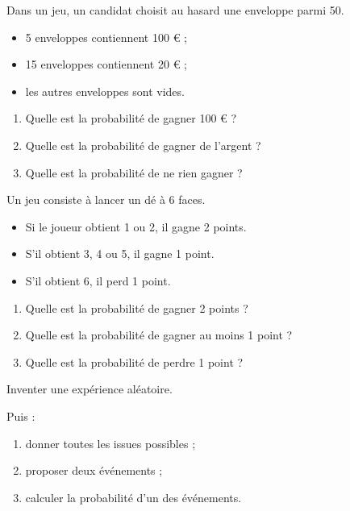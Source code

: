 \documentclass[11pt]{article}
\begin{document}
\begin{exercice}

Dans un jeu, un candidat choisit au hasard une enveloppe parmi 50.

\begin{itemize}
    \item 5 enveloppes contiennent 100 € ;
    \item 15 enveloppes contiennent 20 € ;
    \item les autres enveloppes sont vides.
\end{itemize}

\begin{enumerate}
    \item Quelle est la probabilité de gagner 100 € ?
    \item Quelle est la probabilité de gagner de l'argent ?
    \item Quelle est la probabilité de ne rien gagner ?
\end{enumerate}

\end{exercice}


\begin{exercice}

Un jeu consiste à lancer un dé à 6 faces.

\begin{itemize}
    \item Si le joueur obtient 1 ou 2, il gagne 2 points.
    \item S'il obtient 3, 4 ou 5, il gagne 1 point.
    \item S'il obtient 6, il perd 1 point.
\end{itemize}

\begin{enumerate}
    \item Quelle est la probabilité de gagner 2 points ?
    \item Quelle est la probabilité de gagner au moins 1 point ?
    \item Quelle est la probabilité de perdre 1 point ?
\end{enumerate}

\end{exercice}


\begin{exercice}

Inventer une expérience aléatoire.

Puis :

\begin{enumerate}
    \item donner toutes les issues possibles ;
    \item proposer deux événements ;
    \item calculer la probabilité d'un des événements.
\end{enumerate}

\end{exercice}
\end{document}
